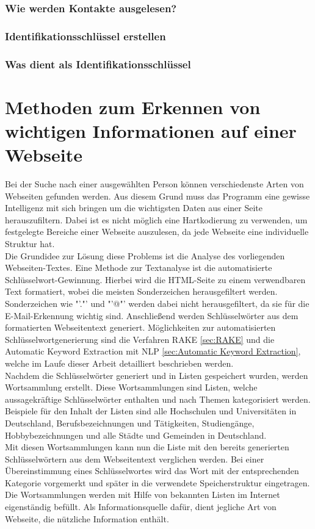 		\subsubsection{Wie werden Kontakte ausgelesen?}
	\subsubsection{Identifikationsschlüssel erstellen}
		\subsubsection{Was dient als Identifikationsschlüssel}
		
		
\section{Methoden zum Erkennen von wichtigen Informationen auf einer Webseite}
\label{subsec:ErkennenVonInformation}
Bei der Suche nach einer ausgewählten Person können verschiedenste Arten von Webseiten gefunden werden. Aus diesem Grund muss das Programm eine gewisse Intelligenz mit sich bringen um die wichtigsten Daten aus einer Seite herauszufiltern. Dabei ist es nicht möglich eine Hartkodierung zu verwenden, um festgelegte Bereiche einer Webseite auszulesen, da jede Webseite eine individuelle Struktur hat.\\
Die Grundidee zur Lösung diese Problems ist die Analyse des vorliegenden Webseiten-Textes. Eine Methode zur Textanalyse ist die automatisierte Schlüsselwort-Gewinnung. Hierbei wird die HTML-Seite zu einem verwendbaren Text formatiert, wobei die meisten Sonderzeichen herausgefiltert werden. Sonderzeichen wie "'."' und "'@"' werden dabei nicht herausgefiltert, da sie für die E-Mail-Erkennung wichtig sind. Anschließend werden Schlüsselwörter aus dem formatierten Webseitentext generiert. Möglichkeiten zur automatisierten Schlüsselwortgenerierung sind die Verfahren RAKE \ref{sec:RAKE} und die Automatic Keyword Extraction mit NLP \ref{sec:Automatic Keyword Extraction}, welche im Laufe dieser Arbeit detailliert beschrieben werden.\\
Nachdem die Schlüsselwörter generiert und in Listen gespeichert wurden, werden Wortsammlung erstellt. Diese Wortsammlungen sind Listen, welche aussagekräftige Schlüsselwörter enthalten und nach Themen kategorisiert werden. Beispiele für den Inhalt der Listen sind alle Hochschulen und Universitäten in Deutschland, Berufsbezeichnungen und Tätigkeiten, Studiengänge, Hobbybezeichnungen und alle Städte und Gemeinden in Deutschland.\\
Mit diesen Wortsammlungen kann nun die Liste mit den bereits generierten Schlüsselwörtern aus dem Webseitentext verglichen werden. Bei einer Übereinstimmung eines Schlüsselwortes wird das Wort mit der entsprechenden Kategorie vorgemerkt und später in die verwendete Speicherstruktur eingetragen. \\
Die Wortsammlungen werden mit Hilfe von bekannten Listen im Internet eigenständig befüllt. Als Informationsquelle dafür, dient jegliche Art von Webseite, die nützliche Information enthält.


